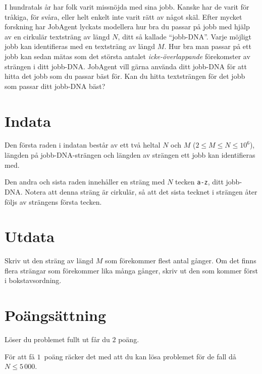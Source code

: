 I hundratals år har folk varit missnöjda med sina jobb.
Kanske har de varit för tråkiga, för svåra, eller helt enkelt inte varit rätt av något skäl.
Efter mycket forskning har JobAgent lyckats modellera hur bra du passar på jobb med hjälp av en cirkulär textsträng av längd $N$, ditt så kallade ``jobb-DNA''.
Varje möjligt jobb kan identifieras med en textsträng av längd $M$.
Hur bra man passar på ett jobb kan sedan mätas som det största antalet \emph{icke-överlappande} förekomster av strängen i ditt jobb-DNA.
JobAgent vill gärna använda ditt jobb-DNA för att hitta det jobb som du passar bäst för.
Kan du hitta textsträngen för det jobb som passar ditt jobb-DNA bäst?

\section*{Indata}
Den första raden i indatan består av ett två heltal $N$ och $M$ ($2 \le M \le N \le 10^6$), längden på jobb-DNA-strängen och längden av strängen ett jobb kan identifieras med.

Den andra och sista raden innehåller en sträng med $N$ tecken \texttt{a-z}, ditt jobb-DNA.
Notera att denna sträng är cirkulär, så att det sista tecknet i strängen åter följs av strängens första tecken.

\section*{Utdata}
Skriv ut den sträng av längd $M$ som förekommer flest antal gånger.
Om det finns flera strängar som förekommer lika många gånger, skriv ut den som kommer först i bokstavsordning.

\section*{Poängsättning}
Löser du problemet fullt ut får du $2$ poäng.

För att få $1$ poäng räcker det med att du kan lösa problemet för de fall då $N \le 5\,000$.
